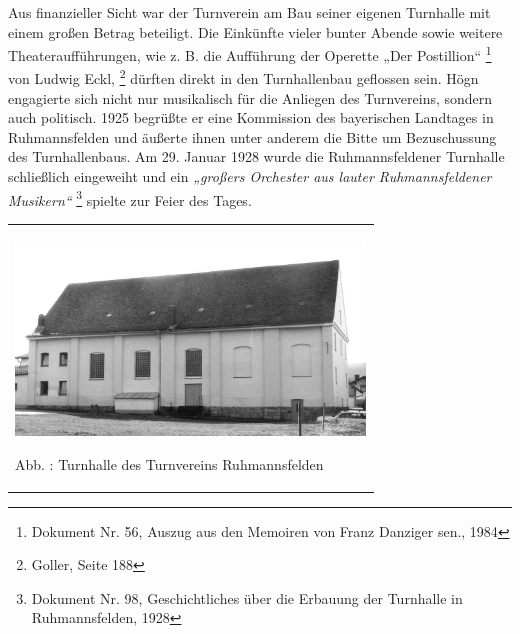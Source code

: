 \documentclass[a4paper]{article}
\newcommand\textstyleZitate[1]{\textit{#1}}
\newcounter{Abb}
\renewcommand\theAbb{\arabic{Abb}}
\begin{document}
Aus finanzieller Sicht war der Turnverein am Bau seiner eigenen
Turnhalle mit einem großen Betrag beteiligt. Die Einkünfte vieler
bunter Abende sowie weitere Theateraufführungen, wie z. B. die
Aufführung der Operette „Der Postillion“  \footnote{Dokument Nr. 56,
Auszug aus den Memoiren von Franz Danziger sen., 1984} von Ludwig
Eckl, \footnote{Goller, Seite 188} dürften direkt in den Turnhallenbau
geflossen sein. Högn engagierte sich nicht nur musikalisch für die
Anliegen des Turnvereins, sondern auch politisch. 1925 begrüßte er eine
Kommission des bayerischen Landtages in Ruhmannsfelden und äußerte
ihnen unter anderem die Bitte um Bezuschussung des Turnhallenbaus. Am
29. Januar 1928 wurde die Ruhmannsfeldener Turnhalle schließlich
eingeweiht und ein \textstyleZitate{„großers Orchester aus lauter
Ruhmannsfeldener Musikern“ } \footnote{Dokument Nr. 98, Geschichtliches
über die Erbauung der Turnhalle in Ruhmannsfelden, 1928} spielte zur
Feier des Tages.

\begin{center}
\begin{minipage}{9.684cm}
\begin{flushleft}
\tablefirsthead{}
\tablehead{}
\tabletail{}
\tablelasttail{}
\begin{supertabular}{m{9.484cm}}

\includegraphics[width=9.303cm,height=5.168cm]{pictures/zulassungsarbeit-img023.jpg}

Abb. \stepcounter{Abb}{\theAbb}: Turnhalle des Turnvereins
Ruhmannsfelden\\
\end{supertabular}
\end{flushleft}
\end{minipage}
\end{center}
\end{document}
